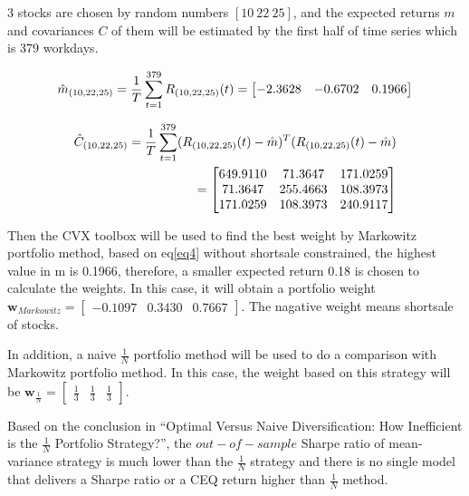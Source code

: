 \documentclass[sigconf]{acmart}
\begin{document}
3 stocks are chosen by random numbers $[10\ 22\ 25]$, and the expected returns $m$ and covariances $C$ of them will be estimated by the first half of time series which is 379 workdays.

\begin{equation} \label{eq5}
\setlength{\abovedisplayskip}{3pt}
\setlength{\belowdisplayskip}{3pt}
\hat{m}_{(10,22,25)} = \frac{1}{T} \sum_{t=1}^{379} R_{(10,22,25)}(t) = \begin{bmatrix}
-2.3628&-0.6702&0.1966
\end{bmatrix}
\end{equation}

\begin{equation} \label{eq6}
\setlength{\abovedisplayskip}{3pt}
\setlength{\belowdisplayskip}{3pt}
\begin{split}
\hat{C}_{(10,22,25)} = \frac{1}{T} \sum_{t=1}^{379} (R_{(10,22,25)}(t)-\hat{m})^{T}(R_{(10,22,25)}(t)-\hat{m}) \\
= \begin{bmatrix}
649.9110 & 71.3647 & 171.0259\\
71.3647 & 255.4663 & 108.3973\\
171.0259 & 108.3973 & 240.9117
\end{bmatrix}
\end{split}
\end{equation}

Then the CVX toolbox will be used to find the best weight by Markowitz portfolio method, based on eq\eqref{eq4} without shortsale constrained, the highest value in m is 0.1966, therefore, a smaller expected return 0.18 is chosen to calculate the weights. In this case, it will obtain a portfolio weight $\bm{w}_{Markowitz} = \begin{bmatrix}-0.1097&0.3430&0.7667\end{bmatrix}$. The nagative weight means shortsale of stocks.

In addition, a naive $\frac{1}{N}$ portfolio method will be used to do a comparison with Markowitz portfolio method. In this case, the weight based on this strategy will be $\bm{w}_{\frac{1}{N}} = \begin{bmatrix}\frac{1}{3}&\frac{1}{3}&\frac{1}{3}\end{bmatrix}$.

Based on the conclusion in ``Optimal Versus Naive Diversification: How Inefficient is the $\frac{1}{N}$ Portfolio Strategy?'', the $out-of-sample$ Sharpe ratio of mean-variance strategy is much lower than the $\frac{1}{N}$ strategy and there is no single model that delivers a Sharpe ratio or a CEQ return higher than $\frac{1}{N}$ method\cite{demiguel2007optimal}.
\end{document}
